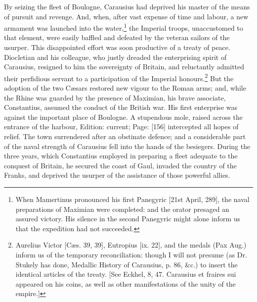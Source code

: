 By seizing the fleet of Boulogne, Carausius had deprived his master of the means of pursuit and revenge. And, when, after vast expense of time and labour, a new armament was launched into the water,\footnote{When Mamertinus pronounced his first Panegyric [21st April, 289], the naval preparations of Maximian were completed: and the orator presaged an assured victory. His silence in the second Panegyric might alone inform us that the expedition had not succeeded.} the Imperial troops, unaccustomed to that element, were easily baffled and defeated by the veteran sailors of the usurper. This disappointed effort was soon productive of a treaty of peace. Diocletian and his colleague, who justly dreaded the enterprising spirit of Carausius, resigned to him the sovereignty of Britain, and reluctantly admitted their perfidious servant to a participation of the Imperial honours.\footnote{Aurelius Victor [Cæs. 39, 39], Eutropius [ix. 22], and the medals (Pax Aug.) inform us of the temporary reconciliation: though I will not presume (as Dr. Stukely has done, Medallic History of Carausius, p. 86, \&c.) to insert the identical articles of the treaty. [See Eckhel, 8, 47. Carausius et fraires sui appeared on his coins, as well as other manifestations of the unity of the empire.]} But the adoption of the two Cæsars restored new vigour to the Roman arms; and, while the Rhine was guarded by the presence of Maximian, his brave associate, Constantius, assumed the conduct of the British war. His first enterprise was against the important place of Boulogne. A stupendous mole, raised across the entrance of the harbour, Edition: current; Page: [156] intercepted all hopes of relief. The town surrendered after an obstinate defence; and a considerable part of the naval strength of Carausius fell into the hands of the besiegers. During the three years, which Constantius employed in preparing a fleet adequate to the conquest of Britain, he secured the coast of Gaul, invaded the country of the Franks, and deprived the usurper of the assistance of those powerful allies.

